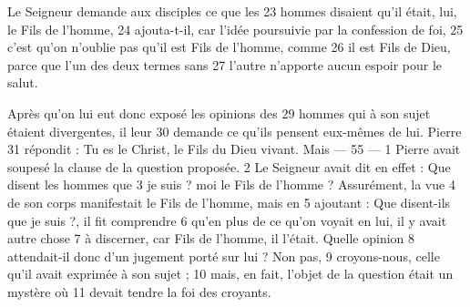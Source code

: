 Le Seigneur demande aux disciples ce que les	 
23	 	hommes disaient qu'il était, lui, le Fils de l'homme,	 
24	 	ajouta-t-il, car l'idée poursuivie par la confession de foi,	 
25	 	c'est qu'on n'oublie pas qu'il est Fils de l'homme, comme	 
26	 	il est Fils de Dieu, parce que l'un des deux termes sans	 
27	 	l'autre n'apporte aucun espoir pour le salut.

Après qu'on lui eut donc exposé les opinions des	 
29	 	hommes qui à son sujet étaient divergentes, il leur	 
30	 	demande ce qu'ils pensent eux-mêmes de lui. Pierre	 
31	 	répondit : Tu es le Christ, le Fils du Dieu vivant. Mais	 
 	--- 55 ---	 
1	 	Pierre avait soupesé la clause de la question proposée.	 
2	 	Le Seigneur avait dit en effet : Que disent les hommes que	 
3	 	je suis ? moi le Fils de l'homme ? Assurément, la vue	 
4	 	de son corps manifestait le Fils de l'homme, mais en	 
5	 	ajoutant : Que disent-ils que je suis ?, il fit comprendre	 
6	 	qu'en plus de ce qu'on voyait en lui, il y avait autre chose	 
7	 	à discerner, car Fils de l'homme, il l'était. Quelle opinion	 
8	 	attendait-il donc d'un jugement porté sur lui ? Non pas,	 
9	 	croyons-nous, celle qu'il avait exprimée à son sujet ;	 
10	 	mais, en fait, l'objet de la question était un mystère où	 
11	 	devait tendre la foi des croyants.